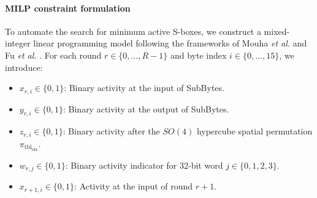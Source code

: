 \documentclass[10pt,twocolumn]{article}
\begin{document}
\paragraph{MILP constraint formulation}
To automate the search for minimum active S-boxes, we construct a mixed-integer linear programming model following the frameworks of Mouha \textit{et al.} \cite{mouha2011differential} and Fu \textit{et al.} \cite{fu2016milp}. For each round $r \in \{0, \dots, R-1\}$ and byte index $i \in \{0, \dots, 15\}$, we introduce:
\begin{itemize}
    \item $x_{r, i} \in \{0, 1\}$: Binary activity at the input of SubBytes.
    \item $y_{r, i} \in \{0, 1\}$: Binary activity at the output of SubBytes.
    \item $z_{r, i} \in \{0, 1\}$: Binary activity after the $SO(4)$ hypercube spatial permutation $\pi_{\text{tbl}_{\text{idx}}}$.
    \item $w_{r, j} \in \{0, 1\}$: Binary activity indicator for 32-bit word $j \in \{0, 1, 2, 3\}$.
    \item $x_{r+1, i} \in \{0, 1\}$: Activity at the input of round $r+1$.
\end{itemize}
\end{document}
